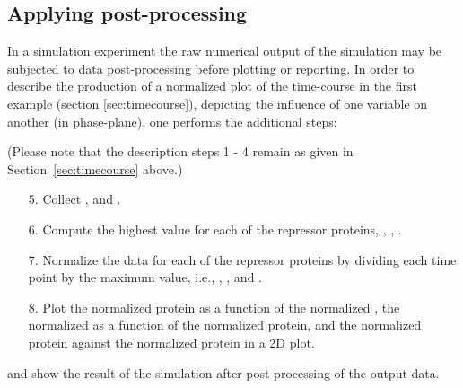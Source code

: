 \subsection{Applying post-processing}
\label{sec:postprocessing}
In a simulation experiment the raw numerical output of the simulation may be subjected to data post-processing before plotting or reporting. In order to describe the production of a normalized plot of the time-course in the first example (section \ref{sec:timecourse}), depicting the influence of one variable on another (in phase-plane), one performs the additional steps:

(Please note that the description steps 1 - 4 remain as given in Section~\ref{sec:timecourse} above.)
\begin{enumerate}
	\item[5.]{Collect ,  and .}
	\item[6.]{Compute the highest value for each of the repressor proteins, , , .}
	\item[7.]{Normalize the data for each of the repressor proteins by dividing each time point by the maximum value, i.e., , , and .}
	\item[8.]{Plot the normalized  protein as a function of the normalized , the normalized  as a function of the normalized  protein, and the normalized  protein against the normalized  protein in a 2D plot.}
\end{enumerate}

 and  show the result of the simulation after post-processing of the output data. 

